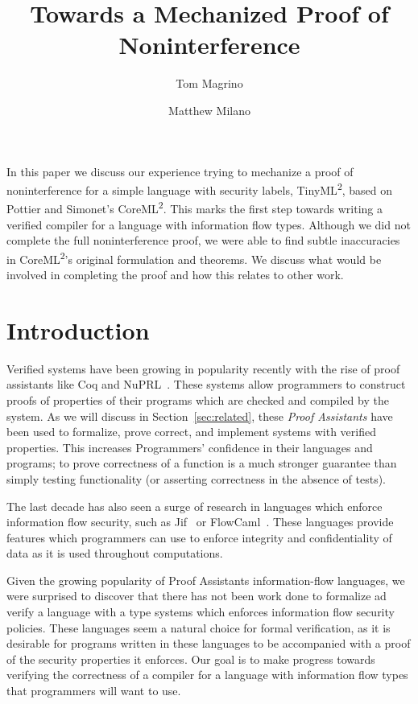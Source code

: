 \documentclass[a4paper,twocolumn]{article}
\title{Towards a Mechanized Proof of Noninterference}
\author{Tom Magrino \and Matthew Milano}
\newcommand{\langName}[0]{TinyML\textsuperscript{2}}
\newcommand{\origLang}[0]{CoreML\textsuperscript{2}}
\theoremstyle{plain}
\theoremstyle{definition}
\begin{document}
\maketitle

\abstract

In this paper we discuss our experience trying to mechanize a proof of
noninterference for a simple language with security labels, \langName, based on
Pottier and Simonet's \origLang.  This
marks the first step towards writing a verified compiler for a language with
information flow types.  Although we did not complete the full noninterference
proof, we were able to find subtle inaccuracies in \origLang's original
formulation and theorems.  We discuss what would be involved in completing the
proof and how this relates to other work.

\section{Introduction}

Verified systems have been growing in popularity recently with the rise of proof
assistants like Coq and NuPRL~\cite{coqart,nuprl}.  
These systems allow programmers to construct proofs of properties of their programs which are checked and compiled by the system.  As we will
discuss in Section~\ref{sec:related}, these \emph{Proof Assistants} have been used to formalize,
prove correct, and implement systems with verified properties.  This increases Programmers' confidence in their languages and programs; to prove correctness of a function is a much stronger guarantee than simply testing functionality (or asserting correctness in the absence of tests).

The last decade has also seen a surge of research in languages which enforce information flow security, such as Jif~\cite{myers1999jflow} or FlowCaml~\cite{simonet2003flow}.  These languages provide features which programmers can use to enforce integrity and confidentiality of data as it is used throughout computations.

Given the growing popularity of Proof Assistants information-flow languages, we were surprised to discover 
that there has not been work done to formalize ad verify a language with a type systems which enforces information flow security policies.
These languages seem a natural choice for formal verification, as it is desirable for programs written in these languages to be accompanied with a proof of the security properties it enforces.
Our goal is to make progress towards verifying the correctness of a
compiler for a language with information flow types that programmers will want
to use.
\end{document}

